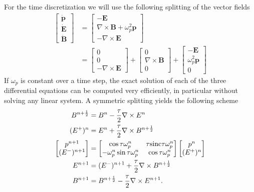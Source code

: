 \documentclass[conference]{IEEEtran}
\newcommand{\np}{n+\frac{1}{2}}
\newcommand{\sinc}{\textnormal{sinc}}
\newcommand{\nt}{\nabla\times}
\newcommand{\cwpnt}{\cos\tau\omega^n_p}
\newcommand{\swpnt}{\sin\tau\omega^n_p}
\newcommand{\scwpnt}{\sinc\tau\omega^n_p}
\renewcommand{\~}{\widetilde }
\begin{document}
For the time discretization we will use the following splitting of the vector fields
\begin{align}
\begin{bmatrix} \dot{\textbf{p}} \\  \dot{\textbf{E}} \\ \dot{\textbf{B}}
\end{bmatrix} &=
\begin{bmatrix} -\textbf{E} \\ \nt \textbf{B} + \omega_p^2 \textbf{p} \\
   -\nt \textbf{E} \end{bmatrix}  \nonumber\\
  &= 
\begin{bmatrix} 0 \\ 0 \\ -\nt \textbf{E}
\end{bmatrix}+\begin{bmatrix} 0 \\ \nt \textbf{B} \\ 0 \end{bmatrix} +
\begin{bmatrix} -\textbf{E} \\ \omega_p^2 \textbf{p} \\ 0
\end{bmatrix} \label{eq:split}
\end{align}
If $\omega_p$ is constant over a time step, the exact solution 
of each of the three differential equations can be computed 
very efficiently, in particular without solving
any linear system. A symmetric splitting yields the following scheme
\begin{subequations}\label{eq:fescheme0}
\begin{align}
 B^{\np}  &= B^n - \frac{\tau}{2}\nt E^n 	  \label{eq:feschemea0}\\
(E^+)^n   &= E^n + \frac{\tau}{2}\nt B^{\np}    
\label{eq:feschemeb0}\\
\begin{bmatrix} p^{n+1}\\(E^-)^{n+1}\end{bmatrix} &= \begin{bmatrix} \cwpnt &
\tau\scwpnt\\-\omega_p^n\swpnt & \cwpnt\end{bmatrix}\begin{bmatrix}
p^n\\(E^+)^n\end{bmatrix}\label{eq:feschemec0}\\
E^{n+1} &= (E^-)^{n+1} + \frac{\tau}{2}\nt
B^{\np}\label{eq:feschemed-}\\
B^{n+1} &= B^{\np} - \frac{\tau}{2}\nt E^{n+1}.
\label{eq:feschemee0}
\end{align}
\end{subequations}
\end{document}
